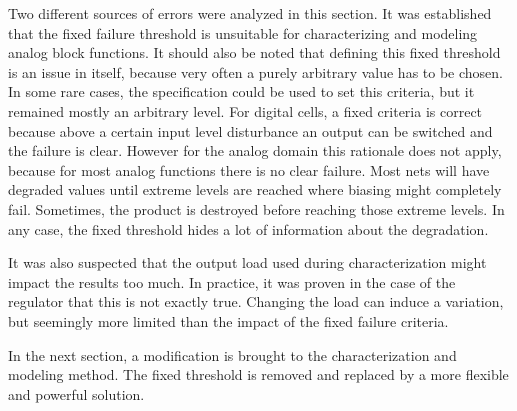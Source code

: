 Two different sources of errors were analyzed in this section.
It was established that the fixed failure threshold is unsuitable for characterizing and modeling analog block functions.
It should also be noted that defining this fixed threshold is an issue in itself, because very often a purely arbitrary value has to be chosen.
In some rare cases, the specification could be used to set this criteria, but it remained mostly an arbitrary level.
For digital cells, a fixed criteria is correct because above a certain input level disturbance an output can be switched and the failure is clear.
However for the analog domain this rationale does not apply, because for most analog functions there is no clear failure.
Most nets will have degraded values until extreme levels are reached where biasing might completely fail.
Sometimes, the product is destroyed before reaching those extreme levels.
In any case, the fixed threshold hides a lot of information about the degradation.

It was also suspected that the output load used during characterization might impact the results too much.
In practice, it was proven in the case of the regulator that this is not exactly true.
Changing the load can induce a variation, but seemingly more limited than the impact of the fixed failure criteria.

In the next section, a modification is brought to the characterization and modeling method.
The fixed threshold is removed and replaced by a more flexible and powerful solution.
